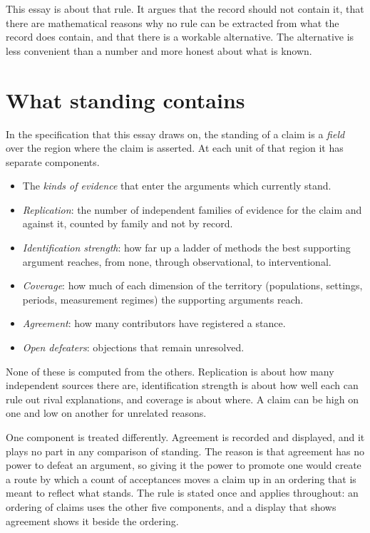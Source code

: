 \documentclass[11pt]{article}
\begin{document}
This essay is about that rule. It argues that the record should not contain it, that there are mathematical reasons why no rule can be extracted from what the record does contain, and that there is a workable alternative. The alternative is less convenient than a number and more honest about what is known.

\section{What standing contains}\label{sec:contains}

In the specification that this essay draws on, the standing of a claim is a \emph{field} over the region where the claim is asserted. At each unit of that region it has separate components.
\begin{itemize}[nosep]
\item The \emph{kinds of evidence} that enter the arguments which currently stand.
\item \emph{Replication}: the number of independent families of evidence for the claim and against it, counted by family and not by record.
\item \emph{Identification strength}: how far up a ladder of methods the best supporting argument reaches, from none, through observational, to interventional.
\item \emph{Coverage}: how much of each dimension of the territory (populations, settings, periods, measurement regimes) the supporting arguments reach.
\item \emph{Agreement}: how many contributors have registered a stance.
\item \emph{Open defeaters}: objections that remain unresolved.
\end{itemize}
None of these is computed from the others. Replication is about how many independent sources there are, identification strength is about how well each can rule out rival explanations, and coverage is about where. A claim can be high on one and low on another for unrelated reasons.

One component is treated differently. Agreement is recorded and displayed, and it plays no part in any comparison of standing. The reason is that agreement has no power to defeat an argument, so giving it the power to promote one would create a route by which a count of acceptances moves a claim up in an ordering that is meant to reflect what stands. The rule is stated once and applies throughout: an ordering of claims uses the other five components, and a display that shows agreement shows it beside the ordering.
\end{document}

